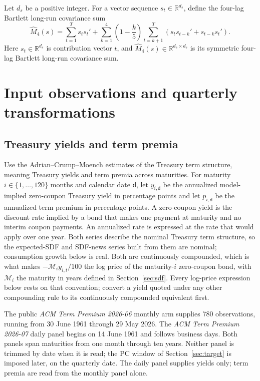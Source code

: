 \documentclass[11pt]{article}
\begin{document}
Let \(d_s\) be a positive integer. For a vector sequence
\(s_t\in\mathbb R^{d_s}\), define the four-lag Bartlett long-run
covariance sum
\begin{equation*}
 \widehat M_4(s)=\sum_{t=1}^{T}s_ts_t'
 +\sum_{k=1}^{4}\left(1-\frac{k}{5}\right)
 \sum_{t=k+1}^{T}(s_ts_{t-k}'+s_{t-k}s_t').
\end{equation*}
Here \(s_t\in\mathbb R^{d_s}\) is contribution vector \(t\), and
\(\widehat M_4(s)\in\mathbb R^{d_s\times d_s}\) is its symmetric four-lag Bartlett long-run
covariance sum.

\section{Input observations and quarterly transformations}
\label{sec:inputs}

\subsection{Treasury yields and term premia}

Use the Adrian--Crump--Moench estimates of the Treasury term structure, meaning Treasury yields and
term premia across maturities. For maturity
\(i\in\{1,\ldots,120\}\) months and calendar date \(\mathsf d\), let \(y_{i,\mathsf d}\) be the
annualized model-implied zero-coupon Treasury yield in percentage points and let
\(p_{i,\mathsf d}\) be the annualized term premium
in percentage points. A zero-coupon yield is the discount rate implied by a bond that makes one
payment at maturity and no interim coupon payments. An annualized rate is expressed at the rate that
would apply over one year. Both series describe the nominal Treasury term structure, so the
expected-SDF and SDF-news series built from them are nominal; consumption growth below is real.
Both are continuously compounded, which is what makes \(-\mathcal M_iy_{i,t}/100\) the log price of
the maturity-\(i\) zero-coupon bond, with \(\mathcal M_i\) the maturity in years defined in
Section~\ref{sec:sdf}. Every log-price expression below rests on that convention; convert a yield
quoted under any other compounding rule to its continuously compounded equivalent first.

The public \emph{ACM Term Premium 2026-06} monthly arm supplies 780 observations, running from
30 June 1961 through 29 May 2026. The \emph{ACM Term Premium 2026-07} daily panel begins on 14 June 1961 and
follows business days. Both panels span maturities from one month through
ten years. Neither panel is trimmed by date when it is read; the PC window of
Section~\ref{sec:target} is imposed later, on the quarterly date. The daily panel supplies yields
only; term premia are read from the monthly panel alone.
\end{document}
